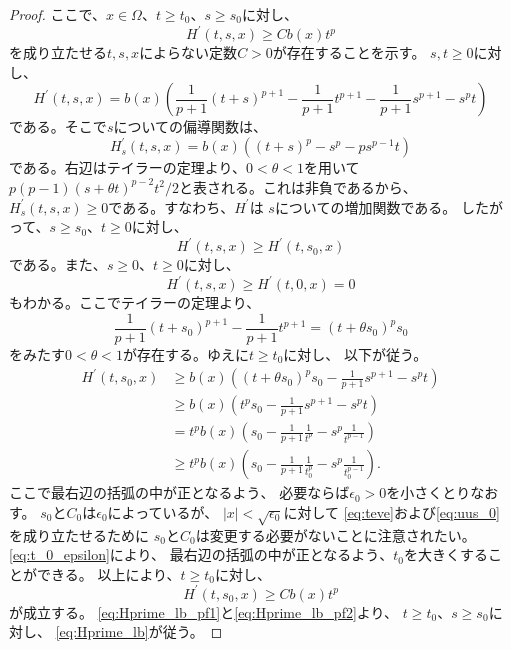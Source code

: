 \begin{proof}
ここで、$x \in \Omega$、$t \geq t_0$、$s \geq s_0$に対し、
\begin{equation}
 H^\prime (t, s, x) \geq C b(x) t^p \label{eq:Hprime_lb}
\end{equation}
を成り立たせる$t, s, x$によらない定数$C>0$が存在することを示す。
$s, t \geq 0$に対し、
\[
 H^\prime(t, s, x) = b(x) \left( \frac{1}{p+1}(t+s)^{p+1} -
 \frac{1}{p+1} t^{p+1} - \frac{1}{p+1} s^{p+1} - s^p t \right)
\]
である。そこで$s$についての偏導関数は、
\[
 H^\prime_s (t, s, x) = b(x) \left( (t+s)^p - s^p - ps^{p-1}t \right)
\]
である。右辺はテイラーの定理より、$0 < \theta < 1$を用いて
$p(p-1)(s + \theta t)^{p-2}t^2/2$と表される。これは非負であるから、
$H^\prime_s(t, s, x) \geq 0$である。すなわち、$H^\prime$は
$s$についての増加関数である。
したがって、$s \geq s_0$、$t \geq 0$に対し、
\begin{equation}
 H^\prime(t, s, x) \geq H^\prime(t, s_0, x) \label{eq:Hprime_lb_pf1}
\end{equation}
である。また、$s \geq 0$、$t \geq 0$に対し、
\begin{equation}
 H^\prime(t, s, x) \geq H^\prime(t, 0, x) = 0 \label{eq:Hprime_lb_pf3}
\end{equation}
もわかる。ここでテイラーの定理より、
\[
 \frac{1}{p+1} (t + s_0)^{p+1} - \frac{1}{p+1} t^{p+1} = (t + \theta
 s_0)^p s_0
\]
 をみたす$0 < \theta < 1$が存在する。ゆえに$t \geq t_0$に対し、
 以下が従う。
 \begin{align*}
  H^\prime(t, s_0, x) &\geq b(x) \left( (t+\theta s_0)^p s_0 -
  \frac{1}{p+1} s^{p+1} - s^p t\right) \\
  & \geq b(x) \left( t^p s_0 - \frac{1}{p+1} s^{p+1} - s^p t \right) \\
  & = t^p b(x) \left( s_0 - \frac{1}{p+1} \frac{1}{t^p} - s^p
  \frac{1}{t^{p-1}}  \right) \\
  & \geq t^p b(x) \left( s_0 - \frac{1}{p+1} \frac{1}{t_0^p} - s^p
  \frac{1}{t_0^{p-1}}  \right).
 \end{align*}
 ここで最右辺の括弧の中が正となるよう、
 必要ならば$\epsilon_0 > 0$を小さくとりなおす。
 $s_0$と$C_0$は$\epsilon_0$によっているが、
 $\lvert x \rvert < \sqrt{\epsilon_0}$に対して
 \eqref{eq:teve}および\eqref{eq:uus_0}を成り立たせるために
 $s_0$と$C_0$は変更する必要がないことに注意されたい。
 \eqref{eq:t_0_epsilon}により、
 最右辺の括弧の中が正となるよう、$t_0$を大きくすることができる。
 以上により、$t \geq t_0$に対し、
 \begin{equation}
  H^\prime (t, s_0, x) \geq C b(x) t^p \label{eq:Hprime_lb_pf2}
 \end{equation}
 が成立する。
 \eqref{eq:Hprime_lb_pf1}と\eqref{eq:Hprime_lb_pf2}より、
 $t \geq t_0$、$s \geq s_0$に対し、
 \eqref{eq:Hprime_lb}が従う。
 

\end{proof}
